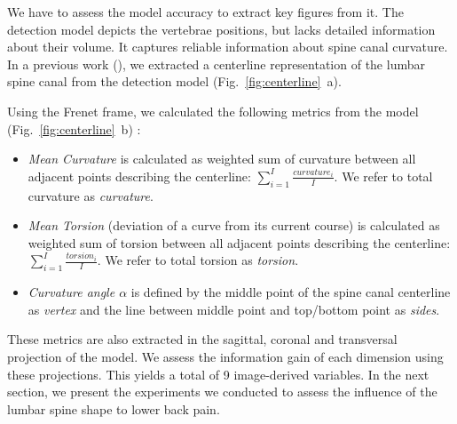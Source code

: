 \documentclass[a4paper,twoside]{style/article}
\begin{document}
We have to assess the model accuracy to extract key figures from it.
The detection model depicts the vertebrae positions, but lacks detailed information about their volume.
It captures reliable information about spine canal curvature.
In a previous work (\cite{Klemm2013VMV}), we extracted a centerline representation of the lumbar spine canal from the detection model (Fig.~\ref{fig:centerline}~a).

Using the Frenet frame, we calculated the following metrics from the model (Fig.~\ref{fig:centerline}~b) \cite{Frenet}:
\begin{itemize}
	\item \emph{Mean Curvature} is calculated as weighted sum of curvature between all adjacent points describing the centerline: $\sum_{i=1}^I \frac{curvature_i}{I}$. We refer to total curvature as \emph{curvature}.
	\item \emph{Mean Torsion} (deviation of a curve from its current course) is calculated as weighted sum of torsion between all adjacent points describing the centerline: $\sum_{i=1}^I \frac{torsion_i}{I}$. We refer to total torsion as \emph{torsion}.
	\item \emph{Curvature angle $\alpha$} is defined by the middle point of the spine canal centerline as \emph{vertex} and the line between middle point and top/bottom point as \emph{sides}.
\end{itemize}
These metrics are also extracted in the sagittal, coronal and transversal projection of the model.
We assess the information gain of each dimension using these projections.
This yields a total of 9 image-derived variables.
In the next section, we present the experiments we conducted to assess the influence of the lumbar spine shape to lower back pain.
\end{document}
